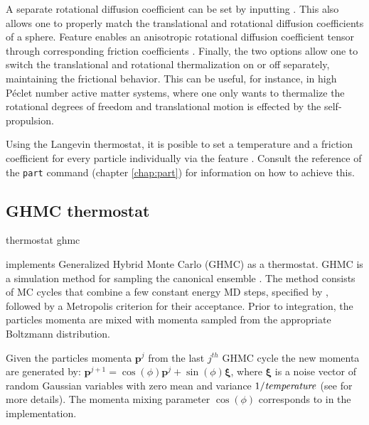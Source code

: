 
A separate rotational diffusion coefficient can be set by inputting . This also allows one to properly match the translational and rotational diffusion coefficients of a sphere.
Feature  enables an anisotropic rotational diffusion coefficient tensor through corresponding friction coefficients   .
Finally, the two options  allow one to switch the translational and rotational thermalization on or off separately, maintaining the frictional behavior. This can be useful, for instance, in high P{\'e}clet number active matter systems, where one only wants to thermalize the rotational degrees of freedom and translational motion is effected by the self-propulsion.

Using the Langevin thermostat, it is posible to set a temperature and
a friction coefficient for every particle individually via the feature
. Consult the reference of the
\texttt{part} command (chapter \ref{chap:part}) for information on how
to achieve this.


\subsection{GHMC thermostat}

\begin{essyntax}
  thermostat ghmc     
\end{essyntax}

\es implements Generalized Hybrid Monte Carlo (GHMC) as a thermostat. GHMC is a
simulation method for sampling the canonical ensemble \cite{mehlig92}. The
method consists of MC cycles that combine a few constant energy MD steps,
specified by , followed by a Metropolis criterion for their
acceptance. Prior to integration, the particles momenta are mixed with momenta
sampled from the appropriate Boltzmann distribution. 

Given the particles momenta $\mathbf{p}^j$ from the last $j^{th}$
GHMC cycle the new momenta are generated
by: $\mathbf{p}^{j+1}=\cos(\phi)\mathbf{p}^j+\sin(\phi)\pmb{\xi}$, where
$\pmb{\xi}$ is a noise vector of random Gaussian variables with zero mean
and variance $1/\mathrm{\mathit{temperature}}$ (see 
\cite{horowitz91} for more details). The
momenta mixing parameter $\cos(\phi)$ corresponds to  in the
implementation.

